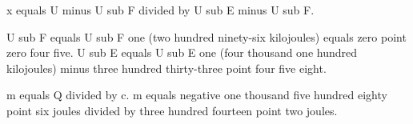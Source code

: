 x equals U minus U sub F divided by U sub E minus U sub F.  

U sub F equals U sub F one (two hundred ninety-six kilojoules) equals zero point zero four five.  
U sub E equals U sub E one (four thousand one hundred kilojoules) minus three hundred thirty-three point four five eight.  

m equals Q divided by c.  
m equals negative one thousand five hundred eighty point six joules divided by three hundred fourteen point two joules.
